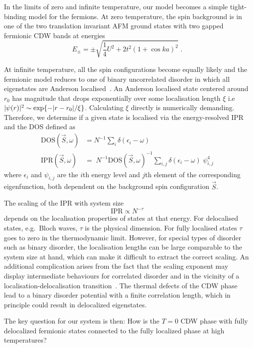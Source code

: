 In the limits of zero and infinite temperature, our model becomes a simple tight-binding model for the fermions. At zero temperature, the spin background is in one of the two translation invariant AFM ground states with two gapped fermionic CDW bands at energies \[E_{\pm} = \pm\sqrt{\frac{1}{4}U^2 + 2t^2(1 + \cos ka)^2}\;.\]

At infinite temperature, all the spin configurations become equally likely and the fermionic model reduces to one of binary uncorrelated disorder in which all eigenstates are Anderson localised~\autocite{abrahamsScalingTheoryLocalization1979}. An Anderson localised state centered around \(r_0\) has magnitude that drops exponentially over some localisation length \(\xi\) i.e \(|\psi(r)|^2 \sim \exp{-\abs{r - r_0}/\xi}\). Calculating \(\xi\) directly is numerically demanding. Therefore, we determine if a given state is localised via the energy-resolved IPR and the DOS defined as \[\begin{aligned}
\mathrm{DOS}(\vec{S}, \omega)& = N^{-1} \sum_{i} \delta(\epsilon_i - \omega)\\
\mathrm{IPR}(\vec{S}, \omega)& = \; N^{-1} \mathrm{DOS}(\vec{S}, \omega)^{-1} \sum_{i,j} \delta(\epsilon_i - \omega)\;\psi^{4}_{i,j}\end{aligned}\] where \(\epsilon_i\) and \(\psi_{i,j}\) are the \(i\)th energy level and \(j\)th element of the corresponding eigenfunction, both dependent on the background spin configuration \(\vec{S}\).

The scaling of the IPR with system size \[\mathrm{IPR} \propto N^{-\tau}\] depends on the localisation properties of states at that energy. For delocalised states, e.g.~Bloch waves, \(\tau\) is the physical dimension. For fully localised states \(\tau\) goes to zero in the thermodynamic limit. However, for special types of disorder such as binary disorder, the localisation lengths can be large comparable to the system size at hand, which can make it difficult to extract the correct scaling. An additional complication arises from the fact that the scaling exponent may display intermediate behaviours for correlated disorder and in the vicinity of a localisation-delocalisation transition~\autocite{kramerLocalizationTheoryExperiment1993,eversAndersonTransitions2008}. The thermal defects of the CDW phase lead to a binary disorder potential with a finite correlation length, which in principle could result in delocalized eigenstates.

The key question for our system is then: How is the \(T=0\) CDW phase with fully delocalized fermionic states connected to the fully localized phase at high temperatures?


